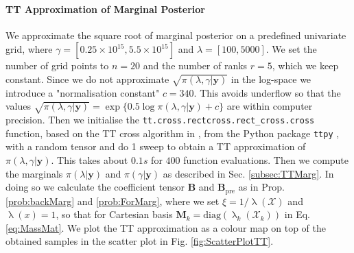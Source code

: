 \paragraph{TT Approximation of Marginal Posterior}
We approximate the square root of marginal posterior on a predefined univariate grid, where $\gamma = [ 0.25 \times 10^{15}, 5.5 \times 10^{15}]$ and $\lambda = [ 100, 5000]$.
We set the number of grid points to $n = 20$ and the number of ranks $r = 5$, which we keep constant.
Since we do not approximate $\sqrt{ \pi( \lambda, \gamma| \bm{y}) }$ in the log-space we introduce a "normalisation constant" $c = 340$. This avoids underflow so that the values $\sqrt{\pi( \lambda,\gamma| \bm{y})} = \exp \{ 0.5 \log  \pi(\lambda,\gamma | \bm{y}) + c \} $ are within computer precision.
Then we initialise the \texttt{tt.cross.rectcross.rect\_cross.cross} function, based on the TT cross algorithm in \cite{OSELEDETS2010TTCross,Dolgov2018TTCross}, from the Python package \texttt{ttpy} \cite{Oseledets2018ttpy}, with a random tensor and do 1 sweep to obtain a TT approximation of $\pi( \lambda,\gamma| \bm{y})$.
This takes about $0.1s$ for $400$ function evaluations.
Then we compute the marginals $\pi(\lambda| \bm{y})$ and $\pi(\gamma| \bm{y})$ as described in Sec. \ref{subsec:TTMarg}.
In doing so we calculate the coefficient tensor $\bm{B}$ and $\bm{B}_{\text{pre}}$ as in Prop. \ref{prob:backMarg} and \ref{prob:ForMarg}, where we set $\xi = 1 / \uplambda (\mathcal{X})$ and $\uplambda(x) = 1$, so that for Cartesian basis $\bm{M}_k = \text{diag}(\uplambda_k(\mathcal{X}_k))$ in Eq. \ref{eq:MassMat}.
We plot the TT approximation as a colour map on top of the obtained samples in the scatter plot in Fig. \ref{fig:ScatterPlotTT}.
